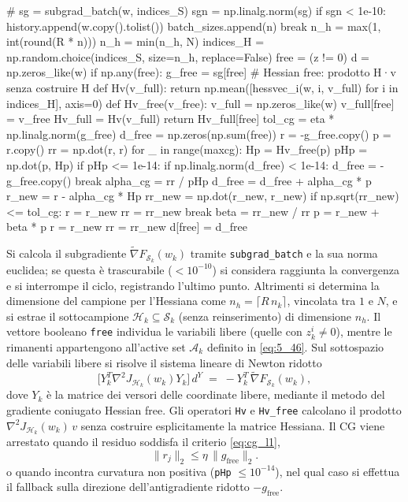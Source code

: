 \documentclass[a4paper,12pt]{article}
\numberwithin{equation}{section}
\numberwithin{figure}{section}
\numberwithin{table}{section}
\begin{document}
\begin{pythoncode}[title= Newton-L1]

#
        sg = subgrad_batch(w, indices_S)
        sgn = np.linalg.norm(sg)
        if sgn < 1e-10:
            history.append(w.copy().tolist())
            batch_sizes.append(n)
            break
        n_h = max(1, int(round(R * n)))
        n_h = min(n_h, N)
        indices_H = np.random.choice(indices_S, size=n_h, replace=False)
        free = (z != 0)
        d = np.zeros_like(w)
        if np.any(free):
            g_free = sg[free]
            # Hessian free: prodotto H·v senza costruire H 
            def Hv(v_full):
                return np.mean([hessvec_i(w, i, v_full) for i in indices_H], axis=0)
            def Hv_free(v_free):
                v_full = np.zeros_like(w)
                v_full[free] = v_free
                Hv_full = Hv(v_full)
                return Hv_full[free]
            tol_cg = eta * np.linalg.norm(g_free)
            d_free = np.zeros(np.sum(free))
            r = -g_free.copy()
            p = r.copy()
            rr = np.dot(r, r)
            for _ in range(maxcg):
                Hp = Hv_free(p)
                pHp = np.dot(p, Hp)
                if pHp <= 1e-14:
                    if np.linalg.norm(d_free) < 1e-14:
                        d_free = -g_free.copy()
                    break
                alpha_cg = rr / pHp
                d_free = d_free + alpha_cg * p
                r_new = r - alpha_cg * Hp
                rr_new = np.dot(r_new, r_new)
                if np.sqrt(rr_new) <= tol_cg:
                    r = r_new
                    rr = rr_new
                    break
                beta = rr_new / rr
                p = r_new + beta * p
                r = r_new
                rr = rr_new
            d[free] = d_free
\end{pythoncode}
Si calcola il subgradiente $\widetilde{\nabla} F_{\mathcal{S}_k}(w_k)$ tramite \texttt{subgrad\_batch} e la sua norma euclidea; se questa è trascurabile ($<10^{-10}$) si considera raggiunta la convergenza e si interrompe il ciclo, registrando l'ultimo punto. Altrimenti si determina la dimensione del campione per l'Hessiana come $n_h=\lceil R\,n_k\rceil$, vincolata tra $1$ e $N$, e si estrae il sottocampione $\mathcal{H}_k\subseteq\mathcal{S}_k$ (senza reinserimento) di dimensione $n_h$. Il vettore booleano \texttt{free} individua le variabili libere (quelle con $z_k^i\neq 0$), mentre le rimanenti appartengono all'active set $\mathcal{A}_k$ definito in \eqref{eq:5_46}. Sul sottospazio delle variabili libere si risolve il sistema lineare di Newton ridotto
\[
\bigl[Y_k^T \nabla^2 J_{\mathcal{H}_k}(w_k) Y_k\bigr]\,d^Y \;=\; -Y_k^T\,\widetilde{\nabla}F_{\mathcal{S}_k}(w_k),
\]
dove $Y_k$ è la matrice dei versori delle coordinate libere, mediante il metodo del gradiente coniugato Hessian free. Gli operatori \texttt{Hv} e \texttt{Hv\_free} calcolano il prodotto $\nabla^2 J_{\mathcal{H}_k}(w_k)\,v$ senza costruire esplicitamente la matrice Hessiana. Il CG viene arrestato quando il residuo soddisfa il criterio \eqref{eq:cg_l1},
\[
\|r_j\|_2 \le \eta\,\|g_{\text{free}}\|_2.
\]
o quando incontra curvatura non positiva (\texttt{pHp} $\le 10^{-14}$), nel qual caso si effettua il fallback sulla direzione dell'antigradiente ridotto $-g_{\text{free}}$.
\end{document}
